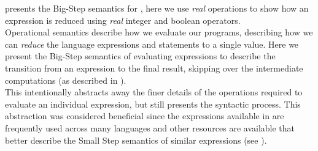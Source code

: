  presents the Big-Step semantics for \thePolicyLang, here we use \emph{real} operations to show how an expression is reduced using \emph{real} integer and boolean operators.\\
Operational semantics describe how we evaluate our programs, describing how we can \emph{reduce} the \thePolicyLang language expressions and statements to a single value. Here we present the Big-Step semantics of evaluating expressions to describe the transition from an expression to the final result, skipping over the intermediate computations (as described in \citet{Myers2007}).\\
This intentionally abstracts away the finer details of the operations required to evaluate an individual expression, but still presents the syntactic process. This abstraction was considered beneficial since the expressions available in \thePolicyLang are frequently used across many languages and other resources are available that better describe the Small Step semantics of similar expressions (see \citet{DBLP:conf/lomaps/Schmidt96}).
